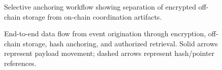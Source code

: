 \begin{figure}[!ht]
\centering
{}
\caption{Selective anchoring workflow showing separation of encrypted off-chain storage from on-chain coordination artifacts.}\label{fig:smartcontract}
\end{figure}

%
%
%
%
%
%


\begin{figure}[!ht]
\centering
{}
\caption{End-to-end data flow from event origination through encryption, off-chain storage, hash anchoring, and authorized retrieval. Solid arrows represent payload movement; dashed arrows represent hash/pointer references.}\label{fig:web3}
\end{figure}

